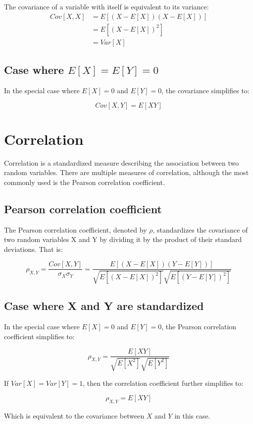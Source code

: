 \documentclass[12pt]{article}
\begin{document}
The covariance of a variable with itself is equivalent to its variance:
\begin{align*}
    Cov[X,X] &= E[(X - E[X])(X - E[X])] \\
    &= E[(X - E[X])^2] \\
    &= Var[X]
\end{align*}

\subsection{\texorpdfstring{Case where $E[X] = E[Y] = 0$}{Case where E[X] = E[Y] = 0}}
In the special case where $E[X] = 0$ and $E[Y] = 0$, the covariance simplifies to:

$$ Cov[X,Y] = E[XY] $$

\section{Correlation}

Correlation is a standardized measure describing the association between two random variables.
There are multiple measures of correlation, although the most commonly used is the Pearson correlation coefficient.

\subsection{Pearson correlation coefficient}

The Pearson correlation coefficient, denoted by $\rho$, standardizes the covariance of two random variables X and Y by dividing it by the product of their standard deviations. That is:

$$
\rho_{X,Y} =
\frac{Cov[X,Y]}{\sigma_X \sigma_Y} =
\frac{E[(X - E[X])(Y - E[Y])]}
{\sqrt{E[ (X - E[X])^2]} \sqrt{E[ (Y - E[Y])^2]}}
$$

\subsection{Case where X and Y are standardized}

In the special case where $E[X] = 0$ and $E[Y] = 0$, the Pearson correlation coefficient simplifies to:

$$ \rho_{X,Y} = \frac{E[XY]}{\sqrt{E[X^2]} \sqrt{E[Y^2]}} $$

If $ Var[X] = Var[Y] = 1$, then the correlation coefficient further simplifies to:

$$ \rho_{X,Y} = E[XY] $$

Which is equivalent to the covariance between $X$ and $Y$ in this case.
\end{document}
